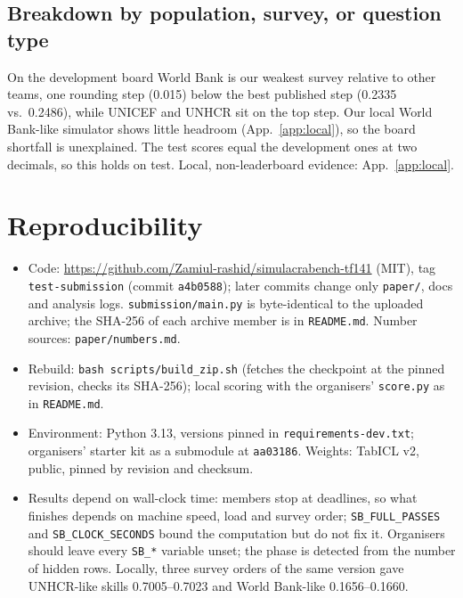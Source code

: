 \documentclass{article}
\begin{document}
\subsection{Breakdown by population, survey, or question type}
On the development board World Bank is our weakest survey relative to other teams, one rounding step (0.015) below the best published step (0.2335 vs.\ 0.2486), while UNICEF and UNHCR sit on the top step. Our local World Bank-like simulator shows little headroom (App.~\ref{app:local}), so the board shortfall is unexplained. The test scores equal the development ones at two decimals, so this holds on test. Local, non-leaderboard evidence: App.~\ref{app:local}.

\section{Reproducibility}
\label{sec:repro}

\begin{itemize}[leftmargin=*,itemsep=0pt,topsep=2pt]
  \item Code: \url{https://github.com/Zamiul-rashid/simulacrabench-tf141} (MIT), tag \texttt{test-submission} (commit \texttt{a4b0588}); later commits change only \texttt{paper/}, docs and analysis logs. \texttt{submission/main.py} is byte-identical to the uploaded archive; the SHA-256 of each archive member is in \texttt{README.md}. Number sources: \texttt{paper/numbers.md}.
  \item Rebuild: \texttt{bash scripts/build\_zip.sh} (fetches the checkpoint at the pinned revision, checks its SHA-256); local scoring with the organisers' \texttt{score.py} as in \texttt{README.md}.
  \item Environment: Python 3.13, versions pinned in \texttt{requirements-dev.txt}; organisers' starter kit as a submodule at \texttt{aa03186}. Weights: TabICL v2, public, pinned by revision and checksum.
  \item Results depend on wall-clock time: members stop at deadlines, so what finishes depends on machine speed, load and survey order; \texttt{SB\_FULL\_PASSES} and \texttt{SB\_CLOCK\_SECONDS} bound the computation but do not fix it. Organisers should leave every \texttt{SB\_*} variable unset; the phase is detected from the number of hidden rows. Locally, three survey orders of the same version gave UNHCR-like skills 0.7005--0.7023 and World Bank-like 0.1656--0.1660.
\end{itemize}
\end{document}
